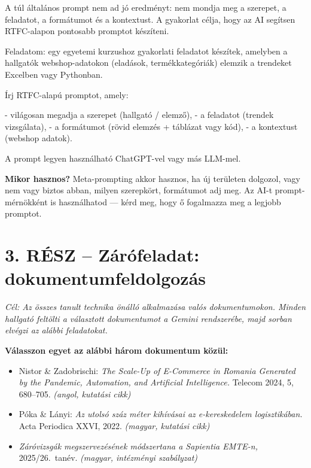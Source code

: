 \documentclass[11pt,a4paper]{article}
\newcommand{\tip}[1]{%
  \vspace{3pt}%
  \begin{tcolorbox}[tipstyle]%
  \textbf{\textcolor{tipborder}{Mikor hasznos?}} #1%
  \end{tcolorbox}\vspace{2pt}}
\newcommand{\lbl}[1]{\vspace{6pt}\noindent{\small\bfseries\textcolor{labelcolor}{#1}}\par\smallskip}
\begin{document}
A túl általános prompt nem ad jó eredményt: nem mondja meg a szerepet,
a feladatot, a formátumot és a kontextust. A gyakorlat célja, hogy az AI
segítsen RTFC-alapon pontosabb promptot készíteni.

\lbl{3. példa -- több lépéses feladat}

\begin{prompt}
Feladatom: egy egyetemi kurzushoz gyakorlati feladatot készítek,
amelyben a hallgatók webshop-adatokon (eladások, termékkategóriák)
elemzik a trendeket Excelben vagy Pythonban.

Írj RTFC-alapú promptot, amely:

- világosan megadja a szerepet (hallgató / elemző),
- a feladatot (trendek vizsgálata),
- a formátumot (rövid elemzés + táblázat vagy kód),
- a kontextust (webshop adatok).

A prompt legyen használható ChatGPT-vel vagy más LLM-mel.
\end{prompt}

\tip{Meta-prompting akkor hasznos, ha új területen dolgozol, vagy nem vagy biztos
abban, milyen szerepkört, formátumot adj meg. Az AI-t prompt-mérnökként is használhatod —
kérd meg, hogy ő fogalmazza meg a legjobb promptot.}

\section{3. RÉSZ -- Zárófeladat: dokumentumfeldolgozás}

\noindent\textit{Cél: Az összes tanult technika önálló alkalmazása valós
dokumentumokon. Minden hallgató feltölti a választott dokumentumot a Gemini rendszerébe,
majd sorban elvégzi az alábbi feladatokat.}

\bigskip
\noindent\textbf{Válasszon egyet az alábbi három dokumentum közül:}

\begin{itemize}[noitemsep, topsep=4pt]
  \item[\textbf{A}] Nistor \& Zadobrischi: \textit{The Scale-Up of
        E-Commerce in Romania Generated by the Pandemic, Automation,
        and Artificial Intelligence.} Telecom 2024, 5, 680--705.
        \textit{(angol, kutatási cikk)}
  \item[\textbf{B}] Póka \& Lányi: \textit{Az utolsó száz méter
        kihívásai az e-kereskedelem logisztikában.}
        Acta Periodica XXVI, 2022.
        \textit{(magyar, kutatási cikk)}
  \item[\textbf{C}] \textit{Záróvizsgák megszervezésének módszertana
        a Sapientia EMTE-n,} 2025/26.\ tanév.
        \textit{(magyar, intézményi szabályzat)}
\end{itemize}
\end{document}
